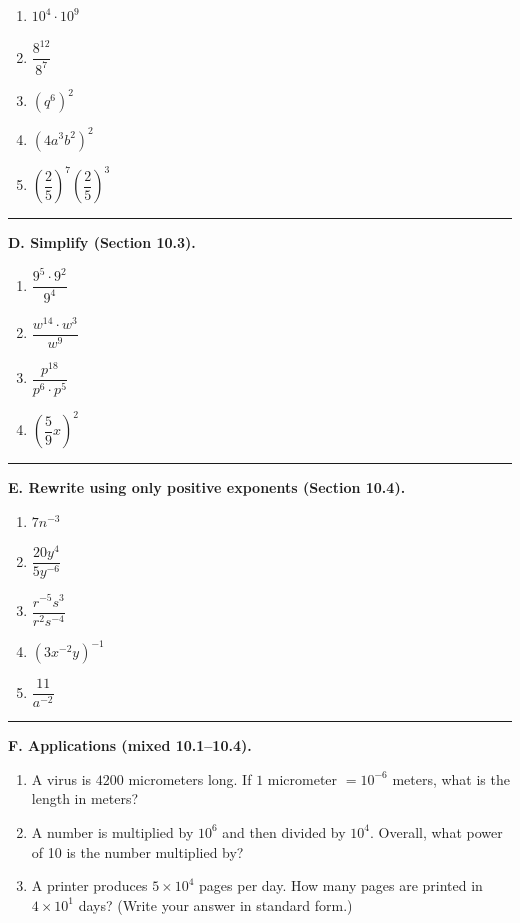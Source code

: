 \documentclass[11pt]{article}
\begin{document}
\begin{enumerate}[label=\arabic*., resume]
\item $10^4 \cdot 10^9$
\item $\dfrac{8^{12}}{8^7}$
\item $(q^6)^2$
\item $(4a^3b^2)^2$
\item $\left(\dfrac{2}{5}\right)^7 \left(\dfrac{2}{5}\right)^3$
\end{enumerate}

\vspace{0.4em}
\hrule
\vspace{0.8em}

\textbf{D. Simplify (Section 10.3).}

\begin{enumerate}[label=\arabic*., resume]
\item $\dfrac{9^5 \cdot 9^2}{9^4}$
\item $\dfrac{w^{14} \cdot w^3}{w^9}$
\item $\dfrac{p^{18}}{p^6 \cdot p^5}$
\item $\left(\dfrac{5}{9}x\right)^2$
\end{enumerate}

\vspace{0.4em}
\hrule
\vspace{0.8em}

\textbf{E. Rewrite using only positive exponents (Section 10.4).}

\begin{enumerate}[label=\arabic*., resume]
\item $7n^{-3}$
\item $\dfrac{20y^4}{5y^{-6}}$
\item $\dfrac{r^{-5}s^3}{r^2 s^{-4}}$
\item $(3x^{-2}y)^{-1}$
\item $\dfrac{11}{a^{-2}}$
\end{enumerate}

\vspace{0.4em}
\hrule
\vspace{0.8em}

\textbf{F. Applications (mixed 10.1--10.4).}

\begin{enumerate}[label=\arabic*., resume]
\item A virus is $4200$ micrometers long. If $1$ micrometer $=10^{-6}$ meters, what is the length in meters?
\item A number is multiplied by $10^6$ and then divided by $10^4$. Overall, what power of 10 is the number multiplied by?
\item A printer produces $5\times10^4$ pages per day. How many pages are printed in $4\times10^1$ days?  
(Write your answer in standard form.)
\end{enumerate}
\end{document}
